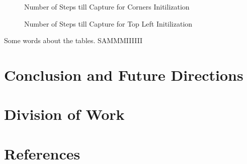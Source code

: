 \documentclass[11pt]{article}
\begin{document}
\begin{figure}[H]
	\caption{Number of Steps till Capture for Corners Initilization}
\end{figure}


\begin{figure}[H]
	\caption{Number of Steps till Capture for Top Left Initilization}
\end{figure}


\begin{multicols}{2}

Some words about the tables. SAMMMIIIIII





\section{Conclusion and Future Directions}

\section{Division of Work}

\section{References}



\end{multicols}
\end{document}
